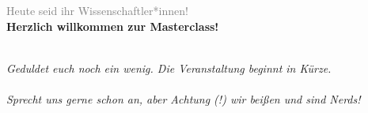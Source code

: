 


\begin{frame}
\, \vspace{-1.75cm}  \Large  \begin{center}
\textcolor{LHCbDarkBlue}{\Event}\\\textcolor{gray}{\small Heute seid ihr Wissenschaftler*innen!} \\  \vspace{2.25cm}
    \textbf{Herzlich willkommen zur Masterclass!} 
\end{center} 
  \small \, \vspace{1cm} \\
    \emph{Geduldet euch noch ein wenig. Die Veranstaltung beginnt in Kürze. \\ \, \\ Sprecht uns gerne schon an, aber Achtung (!) wir beißen und sind Nerds!}
\end{frame}
\section{}




